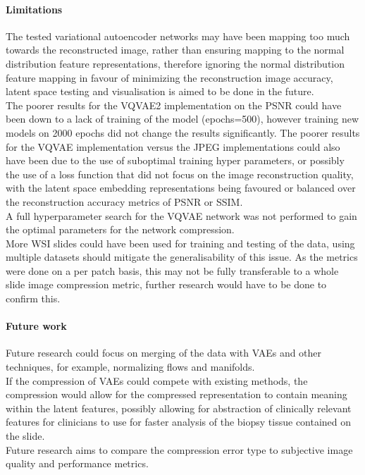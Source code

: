 \documentclass[review]{elsarticle}
\begin{document}

\paragraph{Limitations} The tested variational autoencoder networks may have been mapping too much towards the reconstructed image, rather than ensuring mapping to the normal distribution feature representations, therefore ignoring the normal distribution feature mapping in favour of minimizing the reconstruction image accuracy, latent space testing and visualisation is aimed to be done in the future. \\
The poorer results for the VQVAE2 implementation on the PSNR could have been down to a lack of training of the model (epochs=500), however training new models on 2000 epochs did not change the results significantly. The poorer results for the VQVAE implementation versus the JPEG implementations could also have been due to the use of suboptimal training hyper parameters, or possibly the use of a loss function that did not focus on the image reconstruction quality, with the latent space embedding representations being favoured or balanced over the reconstruction accuracy metrics of PSNR or SSIM. \\
A full hyperparameter search for the VQVAE network was not performed to gain the optimal parameters for the network compression. \\
More WSI slides could have been used for training and testing of the data, using multiple datasets should mitigate the generalisability of this issue. As the metrics were done on a per patch basis, this may not be fully transferable to a whole slide image compression metric, further research would have to be done to confirm this.

\paragraph{Future work} Future research could focus on merging of the data with VAEs and other techniques, for example, normalizing flows and manifolds. \\
If the compression of VAEs could compete with existing methods, the compression would allow for the compressed representation to contain meaning within the latent features, possibly allowing for abstraction of clinically relevant features for clinicians to use for faster analysis of the biopsy tissue contained on the slide. \\
Future research aims to compare the compression error type to subjective image quality and performance metrics. \\
\end{document}
